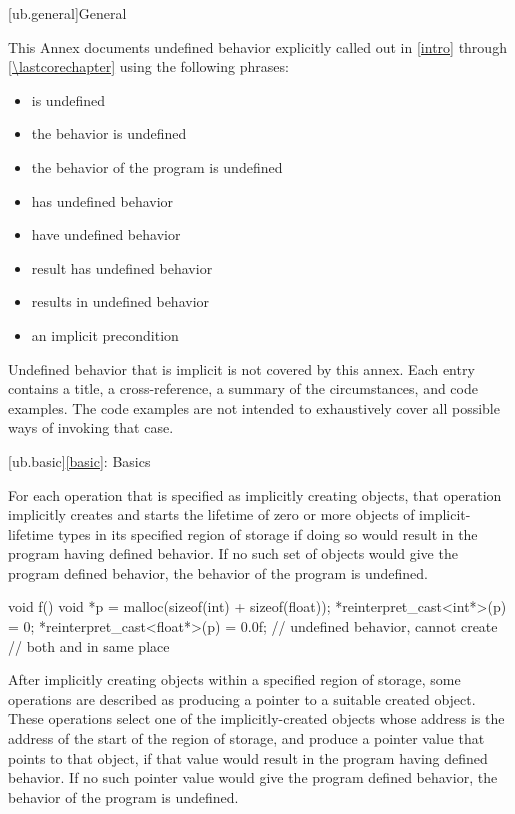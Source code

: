 
[ub.general]{General}

\pnum
This Annex documents
undefined behavior explicitly called out in
\ref{intro} through \ref{\lastcorechapter}
using the following phrases:
\begin{itemize}
\item is undefined
\item the behavior is undefined
\item the behavior of the program is undefined
\item has undefined behavior
\item have undefined behavior
\item result has undefined behavior
\item results in undefined behavior
\item an implicit precondition
\end{itemize}
Undefined behavior that is implicit is not covered by this annex.
Each entry contains
a title,
a cross-reference,
a summary of the circumstances,
and code examples.
The code examples are not intended
to exhaustively cover all possible ways of invoking that case.

[ub.basic]{\ref*{basic}: Basics}


\pnum
For each operation that is specified as implicitly creating objects,
that operation implicitly creates and starts the lifetime
of zero or more objects of implicit-lifetime types
in its specified region of storage
if doing so would result in the program having defined behavior.
If no such set of objects would give the program defined behavior,
the behavior of the program is undefined.

\pnum
\begin{example}
\begin{codeblock}
void f()
{
  void *p = malloc(sizeof(int) + sizeof(float));
  *reinterpret_cast<int*>(p) = 0;
  *reinterpret_cast<float*>(p) = 0.0f;  // undefined behavior, cannot create
                                        // both  and  in same place
}
\end{codeblock}
\end{example}


\pnum
After implicitly creating objects within a specified region of storage,
some operations are described as producing a pointer to a
suitable created object.
These operations select one of the implicitly-created objects
whose address is the address of the start of the region of storage,
and produce a pointer value that points to that object,
if that value would result in the program having defined behavior.
If no such pointer value would give the program defined behavior,
the behavior of the program is undefined.

